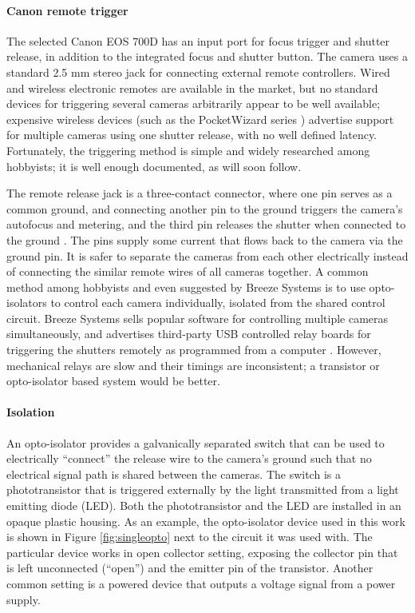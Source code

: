 \paragraph{Canon remote trigger}

The selected Canon EOS 700D has an input port for focus trigger and shutter release, in addition to the integrated focus and shutter button.
The camera uses a standard 2.5 mm stereo jack for connecting external remote controllers.
Wired and wireless electronic remotes are available in the market, but no standard devices for triggering several cameras arbitrarily appear to be well available; expensive wireless devices (such as the PocketWizard series \cite{pocketwizard}) advertise support for multiple cameras using one shutter release, with no well defined latency.
Fortunately, the triggering method is simple and widely researched among hobbyists; it is well enough documented, as will soon follow.

The remote release jack is a three-contact connector, where one pin serves as a common ground, and connecting another pin to the ground triggers the camera's autofocus and metering, and the third pin releases the shutter when connected to the ground \cite{docdiy}.
The pins supply some current that flows back to the camera via the ground pin.
It is safer to separate the cameras from each other electrically instead of connecting the similar remote wires of all cameras together.
A common method among hobbyists and even suggested by Breeze Systems \cite{breezesystemsremote} is to use opto-isolators to control each camera individually, isolated from the shared control circuit.
Breeze Systems sells popular software for controlling multiple cameras simultaneously, and advertises third-party USB controlled relay boards for triggering the shutters remotely as programmed from a computer \cite{breezesystemsremote}.
However, mechanical relays are slow and their timings are inconsistent; a transistor or opto-isolator based system would be better.

\paragraph{Isolation}
An opto-isolator provides a galvanically separated switch that can be used to electrically ``connect'' the release wire to the camera's ground such that no electrical signal path is shared between the cameras.
The switch is a phototransistor that is triggered externally by the light transmitted from a light emitting diode (LED).
Both the phototransistor and the LED are installed in an opaque plastic housing.
As an example, the opto-isolator device used in this work is shown in Figure \ref{fig:singleopto} next to the circuit it was used with.
The particular device works in open collector setting, exposing the collector pin that is left unconnected (``open'') and the emitter pin of the transistor.
Another common setting is a powered device that outputs a voltage signal from a power supply.

